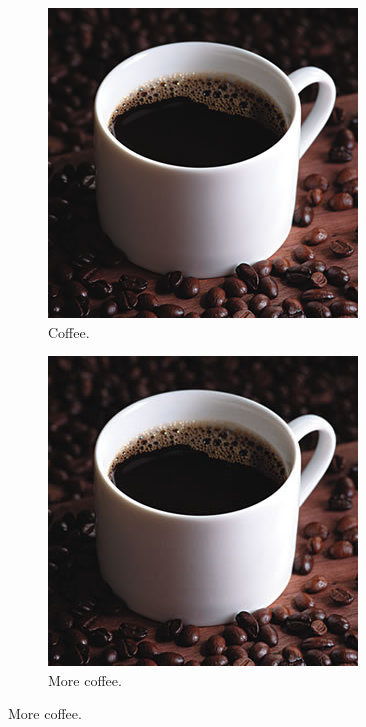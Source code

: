 \begin{figure}[ht!]
	\centering
	\caption{The same cup of coffee. Two times.}
	\begin{subfigure}[b]{0.4\linewidth}
		\includegraphics[width=\linewidth]{2-textuais/figs/coffee.jpg}
		\caption{Coffee.}
	\end{subfigure}
	\begin{subfigure}[b]{0.4\linewidth}
		\includegraphics[width=\linewidth]{2-textuais/figs/coffee.jpg}
		\caption{More coffee.}
	\end{subfigure}
	\label{fig:coffee22}
\end{figure}
    
